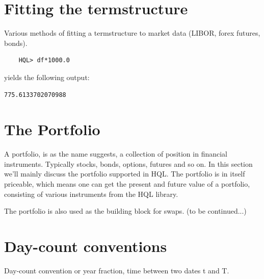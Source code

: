 \documentclass[11pt,a4paper]{article}
\numberwithin{equation}{section}
\begin{document}
	\section{Fitting the termstructure}
	Various methods of fitting a termstructure to market data (LIBOR, forex futures, bonds).

	\begin{lstlisting}
	HQL> df*1000.0
	\end{lstlisting}
	yields the following output:
	\FrameSep
	\begin{lstlisting}[style=Output]
	775.6133702070988
	\end{lstlisting}

	\section{The Portfolio}
	A portfolio, is as the name suggests, a collection of position in financial instruments. Typically stocks, bonds, options, futures and so on. In this section we'll mainly discuss the portfolio supported in HQL. The portfolio is in itself priceable, which means one can get the present and future value of a portfolio, consisting of various instruments from the HQL library.

	The portfolio is also used as the building block for swaps. (to be continued...)

	\section{Day-count conventions}
	Day-count convention or year fraction, time between two dates t and T.


\end{document}
